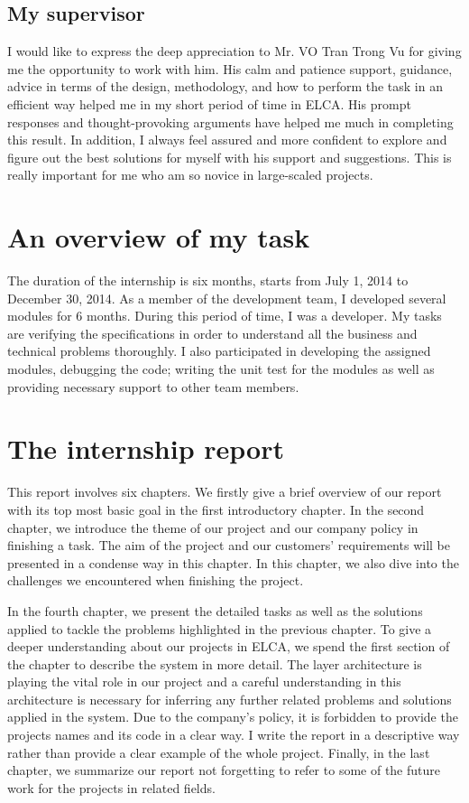 \subsection{My supervisor}
I would like to express the deep appreciation to Mr. VO Tran Trong Vu for giving me the opportunity to work with him. His calm and patience support, guidance, advice in terms of the design, methodology, and how to perform the task in an efficient way helped me in my short period of time in ELCA. His prompt responses and thought-provoking arguments have helped me much in completing this result. In addition, I always feel assured and more confident to explore and figure out the best solutions for myself with his support and suggestions. This is really important for me who am so novice in large-scaled projects.
%

\section{An overview of my task}
The duration of the internship is six months, starts from July 1, 2014 to December 30, 2014.
As a member of the development team, I developed several modules for 6 months. During this period of time, I was a developer. My tasks are verifying the specifications in order to understand all the business and technical problems thoroughly. I also participated in developing the assigned modules, debugging the code; writing the unit test for the modules as well as providing necessary support to other team members. 
%

\section{The internship report}
This report involves six chapters. We firstly give a brief overview of our report with its top most basic goal in the first introductory chapter. In the second chapter, we introduce the theme of our project and our company policy in finishing a task. The aim of the project and our customers' requirements will be presented in a condense way in this chapter. In this chapter, we also dive into the challenges we encountered when finishing the project. 
\par
In the fourth chapter, we present the detailed tasks as well as the solutions applied to tackle the problems highlighted in the previous chapter.  To give a deeper understanding about our projects in ELCA, we spend the first section of the chapter to describe the system in more detail. The layer architecture is playing the vital role in our project and a careful understanding in this architecture is necessary for inferring any further related problems and solutions applied in the system. Due to the company's policy, it is forbidden to provide the projects names and its code in a clear way. I write the report in a descriptive way rather than provide a clear example of the whole project.
Finally, in the last chapter, we summarize our report not forgetting to refer to some of the future work for the projects in related fields. 
%


